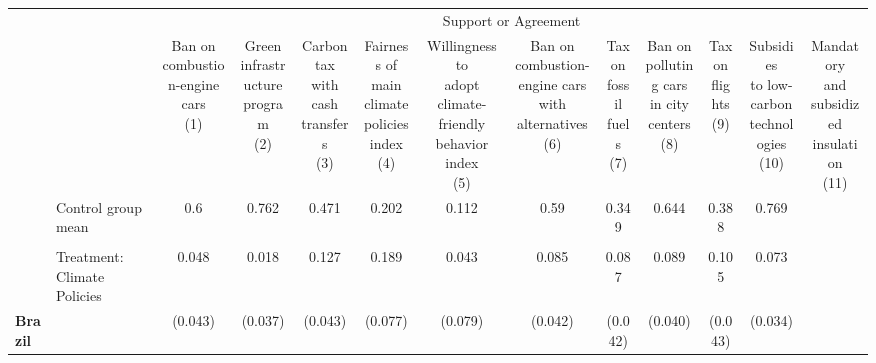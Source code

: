 \begin{tabular}[t]{llccccccccccc}
\toprule
\toprule
\multicolumn{1}{c}{} & \multicolumn{1}{c}{} & \multicolumn{11}{c}{Support or Agreement} \\
\cmidrule(l{3pt}r{3pt}){3-13}
  &   & \makecell{Ban on\\combustion-engine\\cars\\(1)} & \makecell{Green\\infrastructure\\program\\(2)} & \makecell{Carbon tax\\with\\cash transfers\\(3)} & \makecell{Fairness of\\main climate\\policies index\\(4)} & \makecell{Willingness to\\adopt climate-friendly\\behavior index\\(5)} & \makecell{Ban on\\combustion-engine cars\\with alternatives\\(6)} & \makecell{Tax on\\fossil\\fuels\\(7)} & \makecell{Ban on\\polluting cars\\in city centers\\(8)} & \makecell{Tax\\on\\flights\\(9)} & \makecell{Subsidies\\to low-carbon\\technologies\\(10)} & \makecell{Mandatory\\and subsidized\\insulation\\(11)}\\
\midrule
 & Control group mean & 0.6 & 0.762 & 0.471 & 0.202 & 0.112 & 0.59 & 0.349 & 0.644 & 0.388 & 0.769\\
 &  &  &  &  &  &  &  &  &  &  & \\
 & Treatment: Climate Policies & 0.048 & 0.018 & 0.127 & 0.189 & 0.043 & 0.085 & 0.087 & 0.089 & 0.105 & 0.073\\
\textbf{Brazil} &  & (0.043) & (0.037) & (0.043) & (0.077) & (0.079) & (0.042) & (0.042) & (0.040) & (0.043) & (0.034)\\

\end{tabular}
